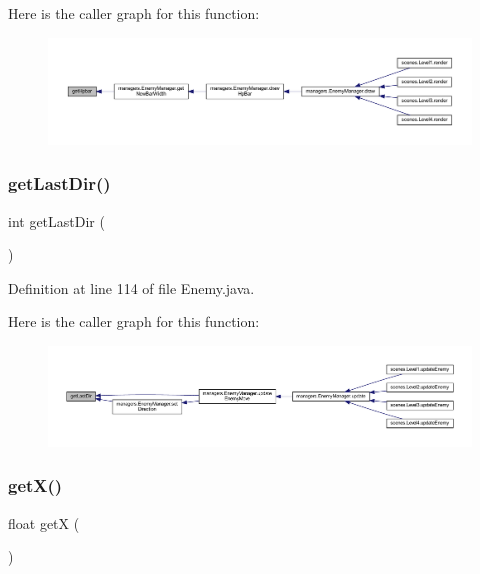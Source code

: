 Here is the caller graph for this function\+:\nopagebreak
\begin{figure}[H]
\begin{center}
\leavevmode
\includegraphics[width=350pt]{classenemies_1_1_enemy_a719baea5da89286e1c263e1beb3ee35d_icgraph}
\end{center}
\end{figure}
\mbox{\label{classenemies_1_1_enemy_a1927b6b5c678c91bde7bfe83531c9a2d}} 
\subsubsection{\texorpdfstring{get\+Last\+Dir()}{getLastDir()}}
{\footnotesize\ttfamily int get\+Last\+Dir (\begin{DoxyParamCaption}{ }\end{DoxyParamCaption})}



Definition at line 114 of file Enemy.\+java.

Here is the caller graph for this function\+:\nopagebreak
\begin{figure}[H]
\begin{center}
\leavevmode
\includegraphics[width=350pt]{classenemies_1_1_enemy_a1927b6b5c678c91bde7bfe83531c9a2d_icgraph}
\end{center}
\end{figure}
\mbox{\label{classenemies_1_1_enemy_ae8f033a71b96920114aee202798dc7e9}} 
\subsubsection{\texorpdfstring{get\+X()}{getX()}}
{\footnotesize\ttfamily float getX (\begin{DoxyParamCaption}{ }\end{DoxyParamCaption})}



